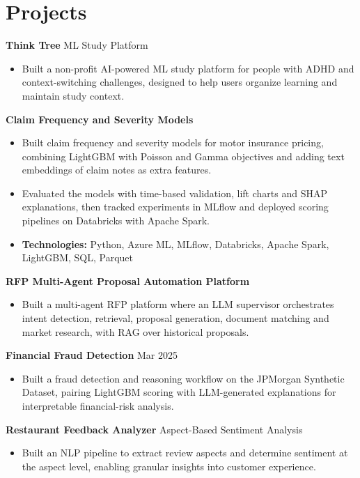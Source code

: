 \documentclass[10pt,a4paper]{article}
\begin{document}
\section{Projects}
\textbf{Think Tree} \textbar{} ML Study Platform\par
\begin{itemize}
  \item Built a non-profit AI-powered ML study platform for people with ADHD and context-switching challenges, designed to help users organize learning and maintain study context.
\end{itemize}
\textbf{Claim Frequency and Severity Models}\par
\begin{itemize}
  \item Built claim frequency and severity models for motor insurance pricing, combining LightGBM with Poisson and Gamma objectives and adding text embeddings of claim notes as extra features.
  \item Evaluated the models with time-based validation, lift charts and SHAP explanations, then tracked experiments in MLflow and deployed scoring pipelines on Databricks with Apache Spark.
  \item \textbf{Technologies:} Python, Azure ML, MLflow, Databricks, Apache Spark, LightGBM, SQL, Parquet
\end{itemize}
\textbf{RFP Multi-Agent Proposal Automation Platform}\par
\begin{itemize}
  \item Built a multi-agent RFP platform where an LLM supervisor orchestrates intent detection, retrieval, proposal generation, document matching and market research, with RAG over historical proposals.
\end{itemize}
\textbf{Financial Fraud Detection} \textbar{} Mar 2025\par
\begin{itemize}
  \item Built a fraud detection and reasoning workflow on the JPMorgan Synthetic Dataset, pairing LightGBM scoring with LLM-generated explanations for interpretable financial-risk analysis.
\end{itemize}
\textbf{Restaurant Feedback Analyzer} \textbar{} Aspect-Based Sentiment Analysis\par
\begin{itemize}
  \item Built an NLP pipeline to extract review aspects and determine sentiment at the aspect level, enabling granular insights into customer experience.
\end{itemize}
\end{document}
